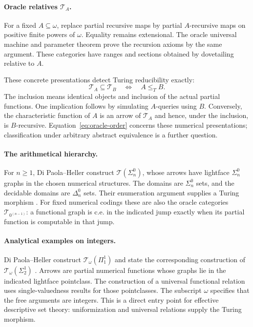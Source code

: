 \documentclass[11pt]{article}
\theoremstyle{definition}
\newcommand{\N}{\omega}
\begin{document}
\paragraph{Oracle relatives $\mathcal T_A$.}
For a fixed $A\subseteq\N$, replace partial recursive maps by partial
$A$-recursive maps on positive finite powers of $\N$. Equality remains
extensional. The oracle universal machine and parameter theorem prove
the recursion axioms by the same argument. These categories have ranges
and sections obtained by dovetailing relative to $A$.

These concrete presentations detect Turing reducibility exactly:
\begin{equation}\label{eq:oracle-order}
 \mathcal T_A\subseteq\mathcal T_B
 \quad\Longleftrightarrow\quad A\leq_T B.
\end{equation}
The inclusion means identical objects and inclusion of the actual
partial functions. One implication follows by simulating $A$-queries
using $B$. Conversely, the characteristic function of $A$ is an arrow
of $\mathcal T_A$ and hence, under the inclusion, is $B$-recursive.
Equation~\eqref{eq:oracle-order} concerns these numerical presentations;
classification under arbitrary abstract equivalence is a further question.

\paragraph{The arithmetical hierarchy.}
For $n\geq1$, Di Paola--Heller construct
$\mathcal T(\Sigma^0_n)$, whose arrows have lightface $\Sigma^0_n$
graphs in the chosen numerical structures. The domains are
$\Sigma^0_n$ sets, and the decidable domains are $\Delta^0_n$ sets.
Their enumeration argument supplies a Turing morphism
\cite[\S4.6, Example 4, p.~606]{DPH}.
For fixed numerical codings these are also the oracle categories
$\mathcal T_{0^{(n-1)}}$: a functional graph is c.e. in the indicated
jump exactly when its partial function is computable in that jump.

\paragraph{Analytical examples on integers.}
Di Paola--Heller construct $\mathcal T_\omega(\Pi^1_1)$ and state
the corresponding construction of $\mathcal T_\omega(\Sigma^1_2)$
\cite[\S4.6, Example 5, pp.~606--607]{DPH}. Arrows are partial
numerical functions whose graphs lie in the indicated lightface
pointclass. The construction of a universal functional relation uses
single-valuedness results for those pointclasses. The subscript
$\omega$ specifies that the free arguments are integers.
This is a direct entry point for effective descriptive set theory:
uniformization and universal relations supply the Turing morphism.
\end{document}
